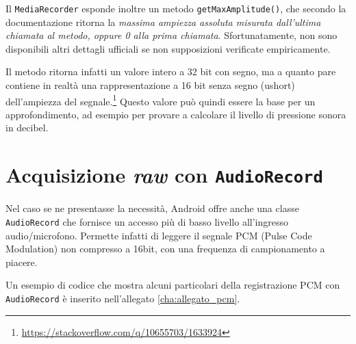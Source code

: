 
Il \texttt{MediaRecorder} esponde inoltre un metodo \texttt{getMaxAmplitude()}, che secondo la documentazione\footnotemark{} ritorna la \emph{massima ampiezza assoluta misurata dall'ultima chiamata al metodo, oppure 0 alla prima chiamata}. Sfortunatamente, non sono disponibili altri dettagli ufficiali se non supposizioni verificate empiricamente.


Il metodo ritorna infatti un valore intero a 32 bit con segno, ma a quanto pare contiene in realtà una rappresentazione a 16 bit senza segno (ushort) dell'ampiezza del segnale.\footnote{\url{https://stackoverflow.com/q/10655703/1633924}} Questo valore può quindi essere la base per un approfondimento, ad esempio per provare a calcolare il livello di pressione sonora in decibel.

\section{Acquisizione \emph{raw} con \texttt{AudioRecord}}
\label{sec:audio_audiorecord}

Nel caso se ne presentasse la necessità, Android offre anche una classe \texttt{AudioRecord} che fornisce un accesso più di basso livello all'ingresso audio/microfono. Permette infatti di leggere il segnale PCM (Pulse Code Modulation) non compresso a 16bit, con una frequenza di campionamento a piacere.

Un esempio di codice che mostra alcuni particolari della registrazione PCM con \texttt{AudioRecord} è inserito nell'allegato \ref{cha:allegato_pcm}.

